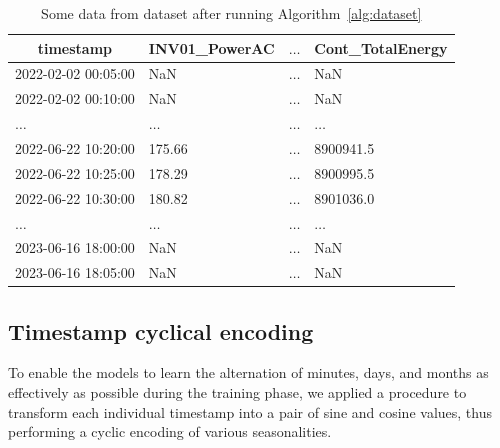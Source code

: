 \begin{table}[H]
	\begin{center}
		\begin{tabular}[c]{l|l|l|l}
			\multicolumn{1}{c|}{\textbf{timestamp}}      &
			\multicolumn{1}{c|}{\textbf{INV01\_PowerAC}} &
			\multicolumn{1}{c|}{\textbf{$\ldots$}}       &
			\multicolumn{1}{c}{\textbf{Cont\_TotalEnergy}}                                 \\
			\hline
			2022-02-02 00:05:00                          & NaN      & $\ldots$ & NaN       \\
			2022-02-02 00:10:00                          & NaN      & $\ldots$ & NaN       \\
			$\ldots$                                     & $\ldots$ & $\ldots$ & $\ldots$  \\
			2022-06-22 10:20:00                          & 175.66   & $\ldots$ & 8900941.5 \\
			2022-06-22 10:25:00                          & 178.29   & $\ldots$ & 8900995.5 \\
			2022-06-22 10:30:00                          & 180.82   & $\ldots$ & 8901036.0 \\
			$\ldots$                                     & $\ldots$ & $\ldots$ & $\ldots$  \\
			2023-06-16 18:00:00                          & NaN      & $\ldots$ & NaN       \\
			2023-06-16 18:05:00                          & NaN      & $\ldots$ & NaN       \\
		\end{tabular}
	\end{center}
	\caption{Some data from dataset after running Algorithm~\ref{alg:dataset}}\label{tab:datasetfinalvalues}
\end{table}

\subsection{Timestamp cyclical encoding}
To enable the models to learn the alternation of minutes, days,
and months as effectively as possible during the training phase,
we applied a procedure to transform each individual timestamp into
a pair of sine and cosine values, thus performing a cyclic
encoding of various seasonalities.



